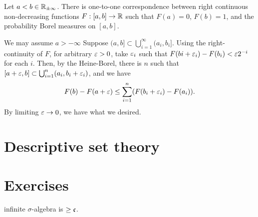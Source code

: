 \documentclass{../../large}
\begin{document}
\begin{prb}
\begin{parts}
\item Let $a<b\in\mathbb{R}_{\pm\infty}$. There is one-to-one correspondence between right continuous non-decreasing functions $F:[a,b]\to\mathbb{R}$ such that $F(a)=0$, $F(b)=1$, and the probability Borel measures on $[a,b]$.
\item 
\end{parts}
\end{prb}
\begin{pf}
We may assume $a>-\infty$
Suppose $(a,b]\subset\bigcup_{i=1}^\infty(a_i,b_i]$.
Using the right-continuity of $F$, for arbitrary $\varepsilon>0$, take $\varepsilon_i$ such that $F(bi+\varepsilon_i)-F(b_i)<\varepsilon2^{-i}$ for each $i$.
Then, by the Heine-Borel, there is $n$ such that $[a+\varepsilon,b]\subset\bigcup_{i=1}^n(a_i,b_i+\varepsilon_i)$, and we have
\[F(b)-F(a+\varepsilon)\le\sum_{i=1}^n(F(b_i+\varepsilon_i)-F(a_i)).\]
By limiting $\varepsilon\to0$, we have what we desired.

\end{pf}

\begin{prb}
\end{prb}

\begin{prb}
\end{prb}

\section{Descriptive set theory}


\section*{Exercises}

\begin{prb}[Cardinalities]
infinite $\sigma$-algebra is $\ge\mathfrak{c}$.

\end{prb}
\end{document}
